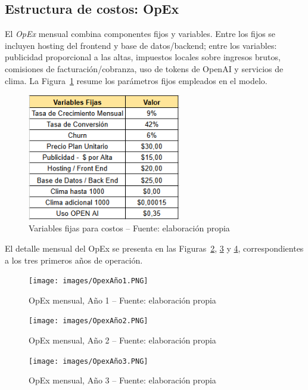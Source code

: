 \subsection{Estructura de costos: OpEx}
El \emph{OpEx} mensual combina componentes fijos y variables. Entre los fijos se incluyen hosting del frontend y base de datos/backend; entre los variables: publicidad proporcional a las altas, impuestos locales sobre ingresos brutos, comisiones de facturación/cobranza, uso de tokens de OpenAI y servicios de clima. La Figura~\ref{fig:costos-variables-fijas} resume los parámetros fijos empleados en el modelo.

\begin{figure}[!htbp]
  \centering
  \includegraphics[width=0.6\textwidth]{images/CostosVariablesFijas.PNG}
  \caption{Variables fijas para costos -- Fuente: elaboración propia}
  \label{fig:costos-variables-fijas}
\end{figure}

El detalle mensual del OpEx se presenta en las Figuras~\ref{fig:opex-anio1}, \ref{fig:opex-anio2} y \ref{fig:opex-anio3}, correspondientes a los tres primeros años de operación.

\begin{figure}[!htbp]
  \centering
  \texttt{[image: images/OpexAño1.PNG]}
  \caption{OpEx mensual, Año 1 -- Fuente: elaboración propia}
  \label{fig:opex-anio1}
\end{figure}

\begin{figure}[!htbp]
  \centering
  \texttt{[image: images/OpexAño2.PNG]}
  \caption{OpEx mensual, Año 2 -- Fuente: elaboración propia}
  \label{fig:opex-anio2}
\end{figure}

\begin{figure}[!htbp]
  \centering
  \texttt{[image: images/OpexAño3.PNG]}
  \caption{OpEx mensual, Año 3 -- Fuente: elaboración propia}
  \label{fig:opex-anio3}
\end{figure}


